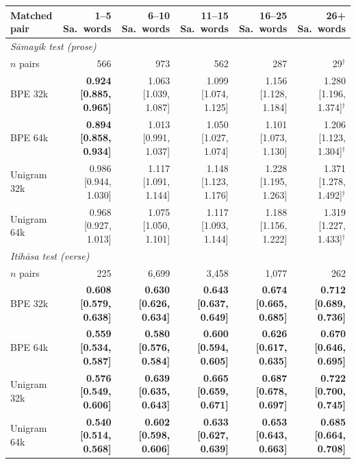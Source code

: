 \begin{table}[t]
\centering
\setlength{\tabcolsep}{3.5pt}
\scriptsize
\begin{tabular}{lrrrrr}
\toprule
Matched pair & 1--5 Sa.\ words & 6--10 Sa.\ words & 11--15 Sa.\ words & 16--25 Sa.\ words & 26+ Sa.\ words \\
\midrule
\multicolumn{6}{l}{\emph{S\=amayik test (prose)}} \\
$n$ pairs & 566 & 973 & 562 & 287 & 29$^{\dagger}$ \\
BPE 32k & \textbf{0.924 [0.885, 0.965]} & 1.063 [1.039, 1.087] & 1.099 [1.074, 1.125] & 1.156 [1.128, 1.184] & 1.280 [1.196, 1.374]$^{\dagger}$ \\
BPE 64k & \textbf{0.894 [0.858, 0.934]} & 1.013 [0.991, 1.037] & 1.050 [1.027, 1.074] & 1.101 [1.073, 1.130] & 1.206 [1.123, 1.304]$^{\dagger}$ \\
Unigram 32k & 0.986 [0.944, 1.030] & 1.117 [1.091, 1.144] & 1.148 [1.123, 1.176] & 1.228 [1.195, 1.263] & 1.371 [1.278, 1.492]$^{\dagger}$ \\
Unigram 64k & 0.968 [0.927, 1.013] & 1.075 [1.050, 1.101] & 1.117 [1.093, 1.144] & 1.188 [1.156, 1.222] & 1.319 [1.227, 1.433]$^{\dagger}$ \\
\midrule
\multicolumn{6}{l}{\emph{Itih\=asa test (verse)}} \\
$n$ pairs & 225 & 6,699 & 3,458 & 1,077 & 262 \\
BPE 32k & \textbf{0.608 [0.579, 0.638]} & \textbf{0.630 [0.626, 0.634]} & \textbf{0.643 [0.637, 0.649]} & \textbf{0.674 [0.665, 0.685]} & \textbf{0.712 [0.689, 0.736]} \\
BPE 64k & \textbf{0.559 [0.534, 0.587]} & \textbf{0.580 [0.576, 0.584]} & \textbf{0.600 [0.594, 0.605]} & \textbf{0.626 [0.617, 0.635]} & \textbf{0.670 [0.646, 0.695]} \\
Unigram 32k & \textbf{0.576 [0.549, 0.606]} & \textbf{0.639 [0.635, 0.643]} & \textbf{0.665 [0.659, 0.671]} & \textbf{0.687 [0.678, 0.697]} & \textbf{0.722 [0.700, 0.745]} \\
Unigram 64k & \textbf{0.540 [0.514, 0.568]} & \textbf{0.602 [0.598, 0.606]} & \textbf{0.633 [0.627, 0.639]} & \textbf{0.653 [0.643, 0.663]} & \textbf{0.685 [0.664, 0.708]} \\
\bottomrule
\end{tabular}

\end{table}
